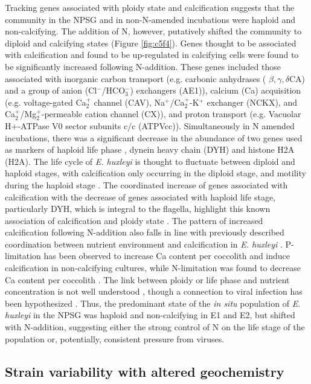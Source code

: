 Tracking genes associated with ploidy state and calcification suggests that the community in the NPSG and in non-N-amended incubations were haploid and non-calcifying. The addition of N, however, putatively shifted the community to diploid and calcifying states (Figure \ref{fig:c5f4}). Genes thought to be associated with calcification \citep{Mackinder2010} and found to be up-regulated in calcifying cells \citep{Mackinder2011} were found to be significantly increased following N-addition. These genes included those associated with inorganic carbon transport (e.g. carbonic anhydrases ( $\beta, \gamma, \delta$CA) and a group of anion (Cl$^-$/HCO$_{3}^-$) exchangers (AE1)), calcium (Ca) acquisition (e.g. voltage-gated Ca$_{2}^+$ channel (CAV), Na$^+$/Ca$_{2}^+$-K$^+$ exchanger (NCKX), and Ca$_{2}^+$/Mg$_{2}^+$-permeable cation channel (CX)), and proton transport (e.g. Vacuolar H+-ATPase V0 sector subunits c/c (ATPVcc)). Simultaneously in N amended incubations, there was a significant decrease in the abundance of two genes used as markers of haploid life phase \citep{Frada2012}, dynein heavy chain (DYH) and histone H2A (H2A). The life cycle of \textit{E. huxleyi} is thought to fluctuate between diploid and haploid stages, with calcification only occurring in the diploid stage, and motility during the haploid stage \citep{Paasche2001}. The coordinated increase of genes associated with calcification with the decrease of genes associated with haploid life stage, particularly DYH, which is integral to the flagella, highlight this known association of calcification and ploidy state \citep{Frada2012}. The pattern of increased calcification following N-addition also falls in line with previously described coordination between nutrient environment and calcification in \textit{E. huxleyi} \citep{Paasche2001}. P-limitation has been observed to increase Ca content per coccolith and induce calcification in non-calcifying cultures, while N-limitation was found to decrease Ca content per coccolith \citep{Paasche1994, Paasche1998}. The link between ploidy or life phase and nutrient concentration is not well understood \citep{Green1996}, though a connection to viral infection has been hypothesized \citep{Frada2008}. Thus, the predominant state of the \textit{in situ} population of \textit{E. huxleyi} in the NPSG was haploid and non-calcifying in E1 and E2, but shifted with N-addition, suggesting either the strong control of N on the life stage of the population or, potentially, consistent pressure from viruses. 

\subsection{Strain variability with altered geochemistry}

